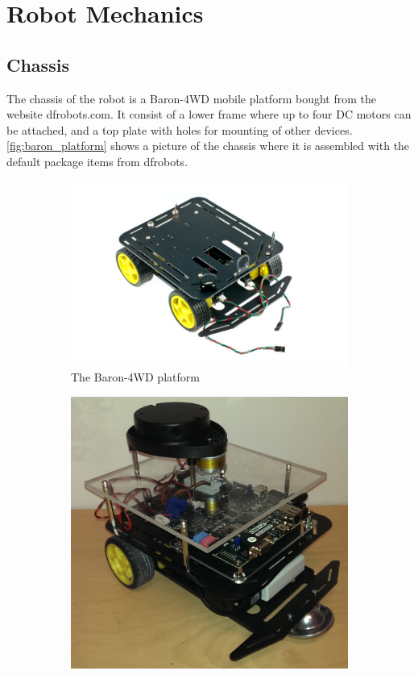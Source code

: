 \documentclass[Main]{subfiles}
\begin{document}
\section{Robot Mechanics} %
	\label{sec:robot_mechanics}

	\subsection{Chassis} %
	\label{sub:chassis}
		The chassis of the robot is a Baron-4WD mobile platform bought from the website dfrobots.com. 
		It consist of a lower frame where up to four DC motors can be attached, and a top plate with holes for mounting of other devices. 
		\autoref{fig:baron_platform} shows a picture of the chassis where it is assembled with the default package items from dfrobots.
		\begin{figure}[H]
			\centering
			\begin{subfigure}[b]{0.55\linewidth}
				\includegraphics[width=1\linewidth]{./Figures/baron_platform.jpg}
				\caption{The Baron-4WD platform}
				\label{fig:baron_platform}
			\end{subfigure}	
			\begin{subfigure}[b]{0.4\linewidth}
				\includegraphics[width=1\linewidth]{./Figures/final_robot.png}

\end{subfigure}
\end{figure}
\end{document}
